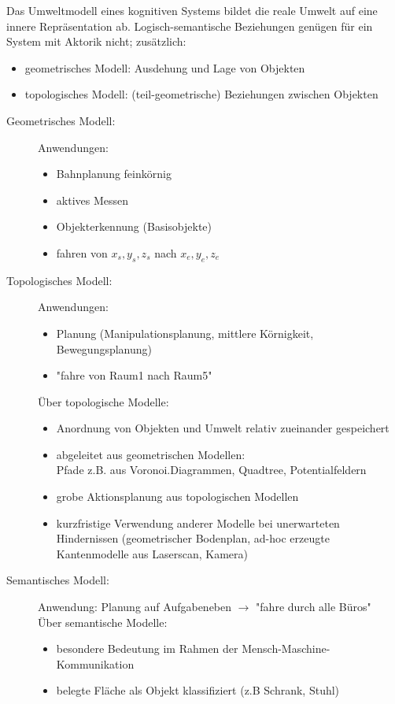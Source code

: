 Das Umweltmodell eines kognitiven Systems bildet die reale Umwelt auf eine innere Repräsentation ab. Logisch-semantische Beziehungen genügen für ein System mit Aktorik nicht; zusätzlich:
\begin{itemize}
\item geometrisches Modell: Ausdehung und Lage von Objekten
\item topologisches Modell: (teil-geometrische) Beziehungen zwischen Objekten
\end{itemize}


\begin{description}
\item[Geometrisches Modell:] Anwendungen:
\begin{itemize}
\item Bahnplanung feinkörnig
\item aktives Messen
\item Objekterkennung (Basisobjekte)
\item fahren von $x_s,y_s,z_s$ nach $x_e,y_e,z_e$
\end{itemize}
\item[Topologisches Modell:] Anwendungen:
\begin{itemize}
\item Planung (Manipulationsplanung, mittlere Körnigkeit, Bewegungsplanung)
\item "{}fahre von Raum1 nach Raum5"{}
\end{itemize}
Über topologische Modelle:
\begin{itemize}
\item Anordnung von Objekten und Umwelt relativ zueinander gespeichert
\item abgeleitet aus geometrischen Modellen: \\ Pfade z.B. aus Voronoi.Diagrammen, Quadtree, Potentialfeldern
\item grobe Aktionsplanung aus topologischen Modellen
\item kurzfristige Verwendung anderer Modelle bei unerwarteten Hindernissen (geometrischer Bodenplan, ad-hoc erzeugte Kantenmodelle aus Laserscan, Kamera)
\end{itemize}
\item[Semantisches Modell:] Anwendung: Planung auf Aufgabeneben $\to$ "{}fahre durch alle Büros"{} \\
Über semantische Modelle:
\begin{itemize}
\item besondere Bedeutung im Rahmen der Mensch-Maschine-Kommunikation
\item belegte Fläche als Objekt klassifiziert (z.B Schrank, Stuhl)

\end{itemize}
\end{description}
